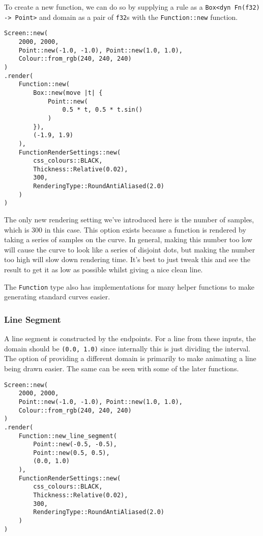 To create a new function, we can do so by supplying a rule as a \verb|Box<dyn Fn(f32) -> Point>| and domain as a pair of \verb|f32|s with the \verb|Function::new| function.

\begin{lstlisting}
Screen::new(
    2000, 2000,
    Point::new(-1.0, -1.0), Point::new(1.0, 1.0),
    Colour::from_rgb(240, 240, 240)
)
.render(
    Function::new(
        Box::new(move |t| {
            Point::new(
                0.5 * t, 0.5 * t.sin()
            )
        }),
        (-1.9, 1.9)
    ),
    FunctionRenderSettings::new(
        css_colours::BLACK,
        Thickness::Relative(0.02),
        300,
        RenderingType::RoundAntiAliased(2.0)
    )
)
\end{lstlisting}


The only new rendering setting we've introduced here is the number of samples, which is 300 in this case. This option exists because a function is rendered by taking a series of samples on the curve. In general, making this number too low will cause the curve to look like a series of disjoint dots, but making the number too high will slow down rendering time. It's best to just tweak this and see the result to get it as low as possible whilst giving a nice clean line.

The \verb|Function| type also has implementations for many helper functions to make generating standard curves easier.

\subsubsection{Line Segment}

A line segment is constructed by the endpoints. For a line from these inputs, the domain should be \verb|(0.0, 1.0)| since internally this is just dividing the interval. The option of providing a different domain is primarily to make animating a line being drawn easier. The same can be seen with some of the later functions.

\begin{lstlisting}
Screen::new(
    2000, 2000,
    Point::new(-1.0, -1.0), Point::new(1.0, 1.0),
    Colour::from_rgb(240, 240, 240)
)
.render(
    Function::new_line_segment(
        Point::new(-0.5, -0.5),
        Point::new(0.5, 0.5),
        (0.0, 1.0)
    ),
    FunctionRenderSettings::new(
        css_colours::BLACK,
        Thickness::Relative(0.02),
        300,
        RenderingType::RoundAntiAliased(2.0)
    )
)
\end{lstlisting}


